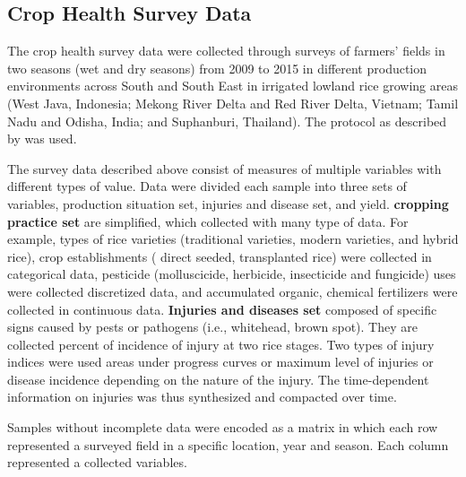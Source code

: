 \subsection*{Crop Health Survey Data}


The crop health survey data were collected through surveys of farmers' fields in two seasons (wet and dry seasons) from 2009 to 2015 in different production environments across South and South East in irrigated lowland rice growing areas (West Java, Indonesia; Mekong River Delta and Red River Delta, Vietnam; Tamil Nadu and Odisha, India; and Suphanburi, Thailand). The protocol as described by  was used. %


The survey data described above consist of measures of multiple variables with different types of value. Data were divided each sample into three sets of variables, production situation set, injuries and disease set, and yield. \textbf{cropping practice set} are simplified, which collected with many type of data. For example, types of rice varieties (traditional varieties, modern varieties, and hybrid rice), crop establishments ( direct seeded, transplanted rice) were collected in categorical data, pesticide (molluscicide, herbicide, insecticide and fungicide) uses were collected discretized data, and accumulated organic, chemical fertilizers were collected in continuous data. \textbf{Injuries and diseases set} composed of specific signs caused by pests or pathogens (i.e., whitehead, brown spot). They are collected percent of incidence of injury at two rice stages. Two types of injury indices were used areas under progress curves or maximum level of injuries or disease incidence depending on the nature of the injury. The time-dependent information on injuries was thus synthesized and compacted over time.

Samples without incomplete data were encoded as a matrix in which each row represented a surveyed field in a specific location, year and season. Each column represented a collected variables.



